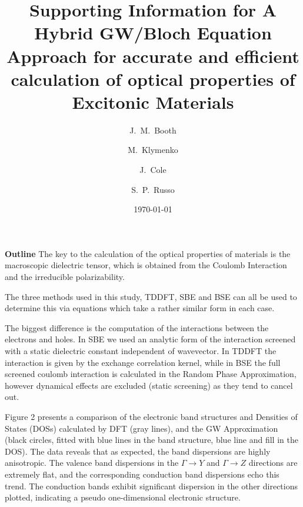 \documentclass[prb,showpacs,superscriptaddress,titlepage,amsmath,amssymb,twocolumn]{revtex4-1}
\begin{document}
\title{
Supporting Information for A Hybrid GW/Bloch Equation Approach for accurate and efficient calculation of optical properties of Excitonic Materials
}
\author{J.~M.~Booth}

\author{M.~Klymenko}


\author{J.~Cole}


\author{S.~P.~Russo}

\date{\today}



\maketitle
\textbf{Outline}
The key to the calculation of the optical properties of materials is the macroscopic dielectric tensor, which is obtained from the Coulomb Interaction and the irreducible polarizability.

The three methods used in this study, TDDFT, SBE and BSE can all be used to determine this via equations which take a rather similar form in each case.

The biggest difference is the computation of the interactions between the electrons and holes. In SBE we used an analytic form of the interaction screened with a static dielectric constant independent of wavevector. In TDDFT the interaction is given by the exchange correlation kernel, while in BSE the full screened coulomb interaction is calculated in the Random Phase Approximation, however dynamical effects are excluded (static screening) as they tend to cancel out.

Figure 2 presents a comparison of the electronic band structures and Densities of States (DOSs) calculated by DFT (gray lines), and the GW Approximation (black circles, fitted with blue lines in the band structure, blue line and fill in the DOS). The data reveals that as expected, the band dispersions are highly anisotropic. The valence band dispersions in the $\Gamma \rightarrow Y$ and $\Gamma \rightarrow Z$ directions are extremely flat, and the corresponding conduction band dispersions echo this trend. The conduction bands exhibit significant dispersion in the other directions plotted, indicating a pseudo one-dimensional electronic structure.
\end{document}
